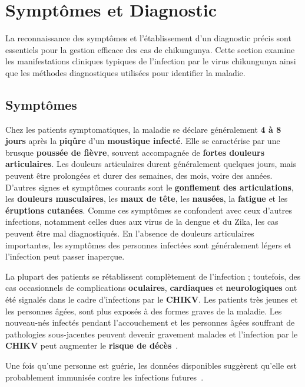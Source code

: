 \section{Symptômes et Diagnostic}
La reconnaissance des symptômes et l'établissement d'un diagnostic précis sont essentiels pour la gestion efficace des cas de chikungunya. Cette section examine les manifestations cliniques typiques de l'infection par le virus chikungunya ainsi que les méthodes diagnostiques utilisées pour identifier la maladie.
\subsection{Symptômes}
Chez les patients symptomatiques, la maladie se déclare généralement \textbf{4 à 8 jours} après la \textbf{piqûre} d'un\textbf{ moustique infecté}. Elle se caractérise par une brusque \textbf{poussée de fièvre}, souvent accompagnée de \textbf{fortes douleurs articulaires}. Les douleurs articulaires durent généralement quelques jours, mais peuvent être prolongées et durer des semaines, des mois, voire des années. D'autres signes et symptômes courants sont le \textbf{gonflement des articulations}, les \textbf{douleurs musculaires}, les \textbf{maux de tête}, les \textbf{nausées}, la \textbf{fatigue} et les \textbf{éruptions cutanées}. Comme ces symptômes se confondent avec ceux d'autres infections, notamment celles dues aux virus de la dengue et du Zika, les cas peuvent être mal diagnostiqués. En l'absence de douleurs articulaires importantes, les symptômes des personnes infectées sont généralement légers et l'infection peut passer inaperçue.

La plupart des patients se rétablissent complètement de l'infection ; toutefois, des cas occasionnels de complications \textbf{oculaires}, \textbf{cardiaques} et \textbf{neurologiques} ont été signalés dans le cadre d'infections par le \textbf{CHIKV}. Les patients très jeunes et les personnes âgées, sont plus exposés à des formes graves de la maladie. Les nouveau-nés infectés pendant l'accouchement et les personnes âgées souffrant de pathologies sous-jacentes peuvent devenir gravement malades et l'infection par le \textbf{CHIKV} peut augmenter le \textbf{risque de décès}~\cite{origin2}.

Une fois qu'une personne est guérie, les données disponibles suggèrent qu'elle est probablement immunisée contre les infections futures~\cite{auerswald2018broad}.

